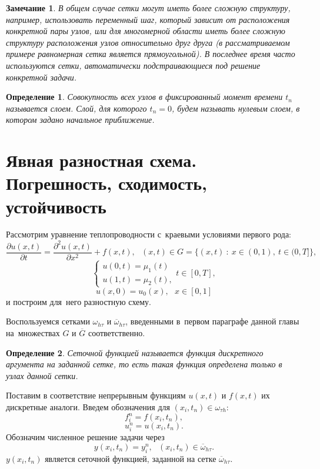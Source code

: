 \documentclass[11pt,a4paper,twoside,listtotoc,bibtotoc]{report}
\numberwithin{equation}{section}
\newtheorem*{definition}{Определение}
\theoremstyle{definition}
\theoremstyle{plain}
\newtheorem*{note*}{Замечание}
\begin{document}
%
\begin{note*}
%
    В общем случае сетки могут иметь более сложную структуру, например,
    использовать переменный шаг, который зависит от расположения конкретной
    пары узлов, или для многомерной области иметь более сложную структуру
    расположения узлов относительно
    друг друга (в рассматриваемом примере равномерная сетка является прямоугольной).
    В последнее время часто используются сетки, автоматически
    подстраивающиеся под решение конкретной задачи.
%
\end{note*}
%
\begin{definition}
%
    Совокупность всех узлов в фиксированный момент времени $t_n$ называется
    слоем. Слой, для которого $t_n = 0$, будем называть нулевым слоем, в котором
    задано начальное приближение.
%
\end{definition}
%
%
\section{Явная разностная схема. Погрешность, сходимость, устойчивость}

Рассмотрим уравнение теплопроводности с~краевыми условиями первого рода:
%
\begin{equation}
%
    \label{temp_equ_2}
    \frac{\partial u(x,t)}{\partial t} =
    \frac{\partial^2u(x,t)}{\partial x^2} + f(x,t),
    ~~~(x,t) \in G = \{(x, t)~:~x \in (0,1),~t\in (0,T]\},
%
\end{equation}
%
%
\begin{equation}
%
    \label{bord_2}
    \begin{cases}
        u(0,t) = \mu_1(t) \\
        u(1,t) = \mu_2(t),
    \end{cases}
    t\in [0,T],
%
\end{equation}
%
%
\begin{equation}
%
    \label{start_val_2}
    u(x,0) = u_0(x),~~~x\in[0,1]
%
\end{equation}
и построим для~него разностную схему.

Воспользуемся сетками $\omega_{h \tau}$ и $\overline{\omega}_{h \tau}$,
введенными в~первом параграфе данной главы на~множествах $G$ и
$\overline{G}$ соответственно.

%
\begin{definition}
%
    Сеточной функцией называется функция дискретного аргумента на заданной сетке,
    то есть такая функция определена только в узлах данной сетки.
%
\end{definition}
%
Поставим в соответствие непрерывным функциям $u(x,t)$ и $f(x,t)$ их
дискретные аналоги. Введем обозначения для $(x_i, t_n) \in \omega_{\tau h}$:
%
$$
    f_i^n = f(x_i,t_n),
$$
%
$$
    u_i^n = u(x_i,t_n).
$$
%
Обозначим численное решение задачи через
%
$$
    y(x_i,t_n) = y_i^n,  ~~~(x_i, t_n) \in \overline{\omega}_{h \tau}.
$$
%
$y(x_i, t_n)$ является сеточной функцией, заданной на сетке
$\overline{\omega}_{h \tau}$.
\end{document}
